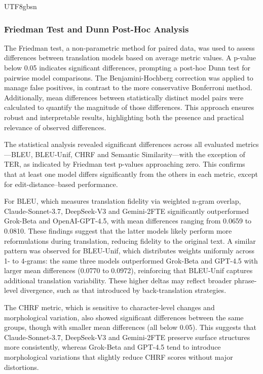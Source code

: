 \documentclass[conference]{IEEEtran}
\begin{document}
\begin{CJK*}{UTF8}{gbsn}
\subsubsection{Friedman Test and Dunn Post-Hoc Analysis}

The Friedman test, a non-parametric method for paired data, was used to assess differences between translation models based on average metric values. A p-value below 0.05 indicates significant differences, prompting a post-hoc Dunn test for pairwise model comparisons. The Benjamini-Hochberg correction was applied to manage false positives, in contrast to the more conservative Bonferroni method. Additionally, mean differences between statistically distinct model pairs were calculated to quantify the magnitude of those differences. This approach ensures robust and interpretable results, highlighting both the presence and practical relevance of observed differences.

The statistical analysis revealed significant differences across all evaluated metrics—BLEU, BLEU-Unif, CHRF and Semantic Similarity—with the exception of TER, as indicated by Friedman test p-values approaching zero. This confirms that at least one model differs significantly from the others in each metric, except for edit-distance–based performance.

For BLEU, which measures translation fidelity via weighted n-gram overlap, Claude-Sonnet-3.7, DeepSeek-V3 and Gemini-2FTE significantly outperformed Grok-Beta and OpenAI-GPT-4.5, with mean differences ranging from 0.0659 to 0.0810. These findings suggest that the latter models likely perform more reformulations during translation, reducing fidelity to the original text. A similar pattern was observed for BLEU-Unif, which distributes weights uniformly across 1- to 4-grams: the same three models outperformed Grok-Beta and GPT-4.5 with larger mean differences (0.0770 to 0.0972), reinforcing that BLEU-Unif captures additional translation variability. These higher deltas may reflect broader phrase-level divergence, such as that introduced by back-translation strategies.

The CHRF metric, which is sensitive to character-level changes and morphological variation, also showed significant differences between the same groups, though with smaller mean differences (all below 0.05). This suggests that Claude-Sonnet-3.7, DeepSeek-V3 and Gemini-2FTE preserve surface structures more consistently, whereas Grok-Beta and GPT-4.5 tend to introduce morphological variations that slightly reduce CHRF scores without major distortions.


\end{CJK*}
\end{document}
